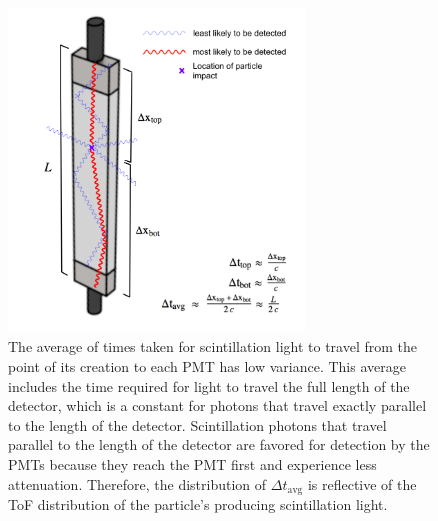 \begin{figure}[h]
\includegraphics[width=0.7\textwidth]{Content/Methods/LightPaths.png}
\caption{The average of times taken for scintillation light to travel from the point of its creation to each PMT has low variance.
This average includes the time required for light to travel the full length of the detector, which is a constant for photons that travel exactly parallel to the length of the detector.
Scintillation photons that travel parallel to the length of the detector are favored for detection by the PMTs because they reach the PMT first and experience less attenuation.
Therefore, the distribution of $\Delta t_{\text{avg}}$ is reflective of the ToF distribution of the particle's producing scintillation light.}
\label{fig:LightPaths}
\end{figure}

